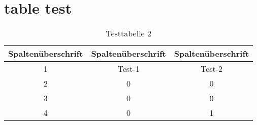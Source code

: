 \section{table test}

\begin{table}[h]
	\centering
	\caption{Testtabelle 2}
	\begin{tabular}{c|c||c|}
		Spaltenüberschrift & Spaltenüberschrift & Spaltenüberschrift \\
		\midrule[2pt]
		1 & Test-1 & Test-2\\ 
		\hline 2 & 0 & 0  \\ 
		3 & 0 & 0  \\ 
		4 & 0 & 1  \\
		\hline 
	\end{tabular}
	\label{tab:Testtabelle-2} 
\end{table}
